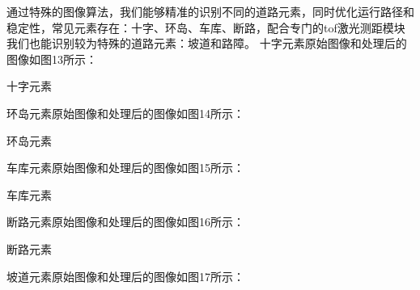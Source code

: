 \documentclass{article}%
\begin{document}
\begin{multicols}{2}
		通过特殊的图像算法，我们能够精准的识别不同的道路元素，同时优化运行路径和稳定性，常见元素存在：十字、环岛、车库、断路，配合专门的tof激光测距模块我们也能识别较为特殊的道路元素：坡道和路障。	
		\newline%
		十字元素原始图像和处理后的图像如图13所示：	
		\begin{center}
			\caption{十字元素}		
		\end{center}	
		环岛元素原始图像和处理后的图像如图14所示：
		\begin{center}
			\caption{环岛元素}		
		\end{center}	
		车库元素原始图像和处理后的图像如图15所示：
		\begin{center}
			\caption{车库元素}		
		\end{center}	
		断路元素原始图像和处理后的图像如图16所示：
		\begin{center}
			\caption{断路元素}		
		\end{center}
		坡道元素原始图像和处理后的图像如图17所示：
		\begin{center}

\end{center}
\end{multicols}
\end{document}
